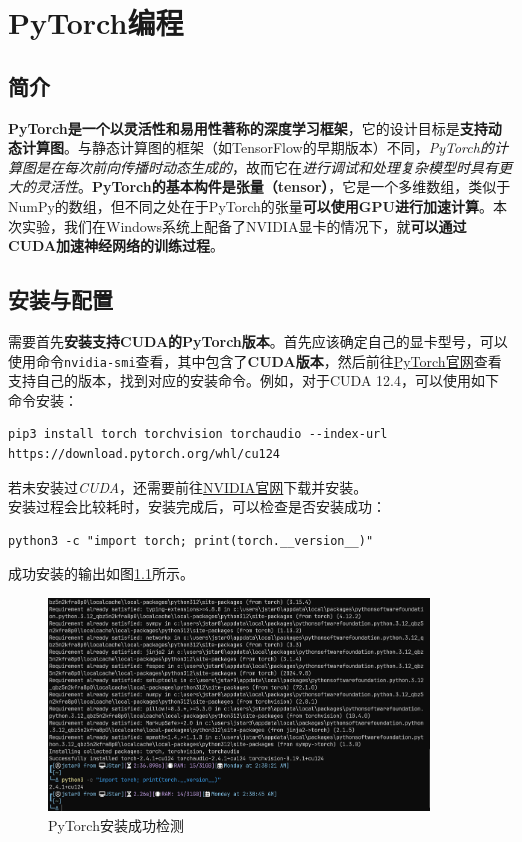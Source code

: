\chapter{PyTorch编程}
\label{cp:pytorch}

\section{简介}

\textbf{PyTorch是一个以灵活性和易用性著称的深度学习框架}，它的设计目标是\textbf{支持动态计算图}。与静态计算图的框架（如TensorFlow的早期版本）不同，\textit{PyTorch的计算图是在每次前向传播时动态生成的}，故而它在\textit{进行调试和处理复杂模型时具有更大的灵活性}。\textbf{PyTorch的基本构件是张量（tensor）}，它是一个多维数组，类似于NumPy的数组，但不同之处在于PyTorch的张量\textbf{可以使用GPU进行加速计算}。本次实验，我们在Windows系统上配备了NVIDIA显卡的情况下，就\textbf{可以通过CUDA加速神经网络的训练过程}。

\section{安装与配置}

需要首先\textbf{安装支持CUDA的PyTorch版本}。首先应该确定自己的显卡型号，可以使用命令\texttt{nvidia-smi}查看，其中包含了\textbf{CUDA版本}，然后前往\href{https://pytorch.org/get-started/locally/}{PyTorch官网}查看支持自己的版本，找到对应的安装命令。例如，对于CUDA 12.4，可以使用如下命令安装：

\begin{verbatim}
pip3 install torch torchvision torchaudio --index-url https://download.pytorch.org/whl/cu124
\end{verbatim}

若未安装过\textit{CUDA}，还需要前往\href{https://developer.nvidia.com/cuda-downloads}{NVIDIA官网}下载并安装。\\

安装过程会比较耗时，安装完成后，可以检查是否安装成功：

\begin{verbatim}
python3 -c "import torch; print(torch.__version__)"
\end{verbatim}

成功安装的输出如图\ref{fig:pytorch-version}所示。

\begin{figure}[htbp]
    \centering
    \includegraphics[width=0.9\textwidth]{Figures/installtorch.png}
    \caption{PyTorch安装成功检测}
    \label{fig:pytorch-version}
\end{figure}

